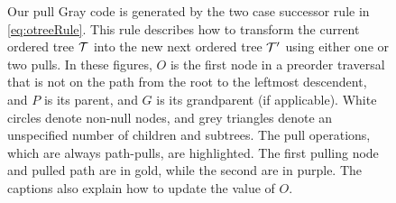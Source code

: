 \begin{figure}[H]
    \caption[Our pull Gray code is generated by the two case successor rule in \eqref{eq:otreeRule}.]{Our pull Gray code is generated by the two case successor rule in \eqref{eq:otreeRule}.
    This rule describes how to transform the current ordered tree $\mathcal{T}$ into the new next ordered tree $\mathcal{T'}$ using either one or two pulls.
    In these figures, ${O}$ is the first node in a preorder traversal that is not on the path from the root to the leftmost descendent, and ${P}$ is its parent, and ${G}$ is its grandparent (if applicable).
    White circles denote non-null nodes, and grey triangles denote an unspecified number of children and subtrees.
    The pull operations, which are always path-pulls, are highlighted.
    The first pulling node and pulled path are in gold, while the second are in purple.
    The captions also explain how to update the value of ${O}$.}
    \label{fig:next}
\end{figure}

